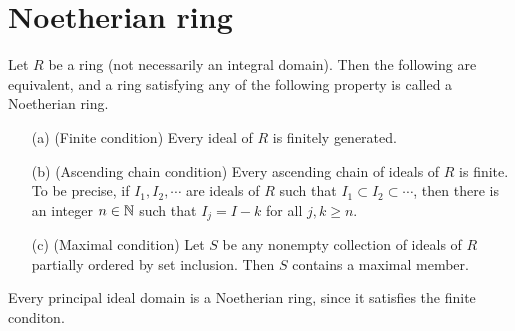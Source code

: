 \section{Noetherian ring}

\begin{defi}
    Let $R$ be a ring (not necessarily an integral domain).
    Then the following are equivalent, and a ring satisfying any of the following property is called a Noetherian ring.
    \begin{enumerate}
        \item[(a)]
        {
            (Finite condition)
            Every ideal of $R$ is finitely generated.
        }
        \item[(b)]
        {
            (Ascending chain condition)
            Every ascending chain of ideals of $R$ is finite.
            To be precise, if $I_1, I_2, \cdots$ are ideals of $R$ such that $I_1\subset I_2\subset\cdots$, then there is an integer $n\in{\mathbb{N}}$ such that $I_j=I-k$ for all $j, k\geq n$.
        }
        \item[(c)]
        {
            (Maximal condition)
            Let $S$ be any nonempty collection of ideals of $R$ partially ordered by set inclusion.
            Then $S$ contains a maximal member.
        }
    \end{enumerate}
\end{defi}
\begin{rmk}
    Every principal ideal domain is a Noetherian ring, since it satisfies the finite conditon.
\end{rmk}
